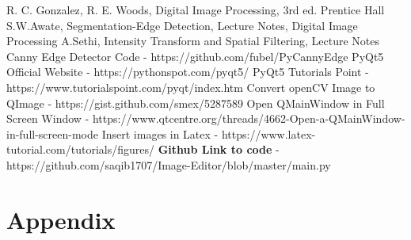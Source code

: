 \documentclass[letterpaper, 10 pt, conference]{ieeeconf}  %
\begin{document}


\begin{thebibliography}{99}
 R. C. Gonzalez, R. E. Woods, Digital Image Processing, 3rd ed. Prentice Hall
 S.W.Awate, Segmentation-Edge Detection, Lecture Notes, Digital Image Processing
 A.Sethi, Intensity Transform and Spatial Filtering, Lecture Notes
 Canny Edge Detector Code - https://github.com/fubel/PyCannyEdge
 PyQt5 Official Website - https://pythonspot.com/pyqt5/
 PyQt5 Tutorials Point - https://www.tutorialspoint.com/pyqt/index.htm
 Convert openCV Image to QImage - https://gist.github.com/smex/5287589
 Open QMainWindow in Full Screen Window - https://www.qtcentre.org/threads/4662-Open-a-QMainWindow-in-full-screen-mode
 Insert images in Latex - https://www.latex-tutorial.com/tutorials/figures/
 \textbf{Github Link to code} - https://github.com/saqib1707/Image-Editor/blob/master/main.py
\end{thebibliography}

\onecolumn
\section{Appendix}
\end{document}
